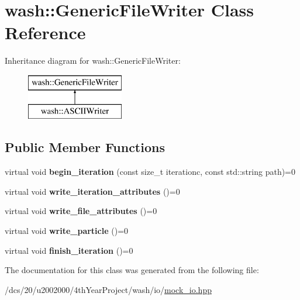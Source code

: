 \hypertarget{classwash_1_1GenericFileWriter}{}\section{wash\+:\+:Generic\+File\+Writer Class Reference}
\label{classwash_1_1GenericFileWriter}
Inheritance diagram for wash\+:\+:Generic\+File\+Writer\+:\begin{figure}[H]
\begin{center}
\leavevmode
\includegraphics[height=2.000000cm]{classwash_1_1GenericFileWriter}
\end{center}
\end{figure}
\subsection*{Public Member Functions}
\begin{DoxyCompactItemize}
\item 
\mbox{\label{classwash_1_1GenericFileWriter_a49342d81471a3f9384fafecd137e2a98}} 
virtual void {\bfseries begin\+\_\+iteration} (const size\+\_\+t iterationc, const std\+::string path)=0
\item 
\mbox{\label{classwash_1_1GenericFileWriter_a568ec97b1a75e7584d1b300c19cfe551}} 
virtual void {\bfseries write\+\_\+iteration\+\_\+attributes} ()=0
\item 
\mbox{\label{classwash_1_1GenericFileWriter_ac9db7869b5213e3d88013cdd49f6f0de}} 
virtual void {\bfseries write\+\_\+file\+\_\+attributes} ()=0
\item 
\mbox{\label{classwash_1_1GenericFileWriter_a3e1743ef97b73b3a3f7aadfd864b1a96}} 
virtual void {\bfseries write\+\_\+particle} ()=0
\item 
\mbox{\label{classwash_1_1GenericFileWriter_a8fa13e333a95b3b22917920bb1ad40ad}} 
virtual void {\bfseries finish\+\_\+iteration} ()=0
\end{DoxyCompactItemize}


The documentation for this class was generated from the following file\+:\begin{DoxyCompactItemize}
\item 
/dcs/20/u2002000/4th\+Year\+Project/wash/io/\mbox{\hyperlink{mock__io_8hpp}{mock\+\_\+io.\+hpp}}\end{DoxyCompactItemize}
